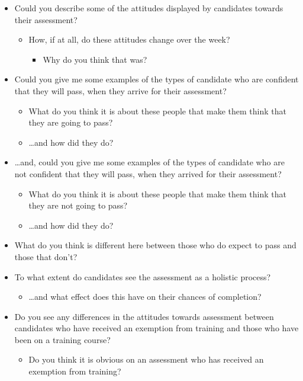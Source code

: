 \documentclass[
  12pt,
  a4paper,
]{book}
\providecommand{\tightlist}{%
  \setlength{\itemsep}{0pt}\setlength{\parskip}{0pt}}
\begin{document}
\begin{itemize}
\tightlist
\item
  Could you describe some of the attitudes displayed by candidates towards their assessment?

  \begin{itemize}
  \tightlist
  \item
    How, if at all, do these attitudes change over the week?

    \begin{itemize}
    \tightlist
    \item
      Why do you think that was?
    \end{itemize}
  \end{itemize}
\item
  Could you give me some examples of the types of candidate who are confident that they will pass, when they arrive for their assessment?

  \begin{itemize}
  \tightlist
  \item
    What do you think it is about these people that make them think that they are going to pass?
  \item
    \ldots and how did they do?
  \end{itemize}
\item
  \ldots and, could you give me some examples of the types of candidate who are not confident that they will pass, when they arrived for their assessment?

  \begin{itemize}
  \tightlist
  \item
    What do you think it is about these people that make them think that they are not going to pass?
  \item
    \ldots and how did they do?
  \end{itemize}
\item
  What do you think is different here between those who do expect to pass and those that don't?
\item
  To what extent do candidates see the assessment as a holistic process?

  \begin{itemize}
  \tightlist
  \item
    \ldots and what effect does this have on their chances of completion?
  \end{itemize}
\item
  Do you see any differences in the attitudes towards assessment between candidates who have received an exemption from training and those who have been on a training course?

  \begin{itemize}
  \tightlist
  \item
    Do you think it is obvious on an assessment who has received an exemption from training?
  \end{itemize}
\end{itemize}
\end{document}

